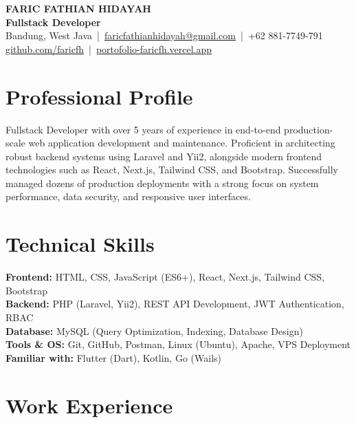\documentclass[11pt,a4paper]{article}
\begin{document}
\begin{center}
  {\LARGE \textbf{FARIC FATHIAN HIDAYAH}}\\
  \vspace{4pt}
  \textbf{Fullstack Developer} \\
  \vspace{6pt}
  Bandung, West Java \,|\, 
  \href{mailto:faricfathianhidayah@gmail.com}{faricfathianhidayah@gmail.com} \,|\, 
  +62 881-7749-791 \\
  \href{https://github.com/faricfh}{github.com/faricfh} \,|\, 
  \href{https://portofolio-faricfh.vercel.app}{portofolio-faricfh.vercel.app}
\end{center}

\section*{Professional Profile}
Fullstack Developer with over 5 years of experience in end-to-end production-scale web application development and maintenance. Proficient in architecting robust backend systems using Laravel and Yii2, alongside modern frontend technologies such as React, Next.js, Tailwind CSS, and Bootstrap. Successfully managed dozens of production deployments with a strong focus on system performance, data security, and responsive user interfaces.

\section*{Technical Skills}
\textbf{Frontend:} HTML, CSS, JavaScript (ES6+), React, Next.js, Tailwind CSS, Bootstrap \\
\textbf{Backend:} PHP (Laravel, Yii2), REST API Development, JWT Authentication, RBAC \\
\textbf{Database:} MySQL (Query Optimization, Indexing, Database Design) \\
\textbf{Tools \& OS:} Git, GitHub, Postman, Linux (Ubuntu), Apache, VPS Deployment \\
\textbf{Familiar with:} Flutter (Dart), Kotlin, Go (Wails)

\section*{Work Experience}
\end{document}
